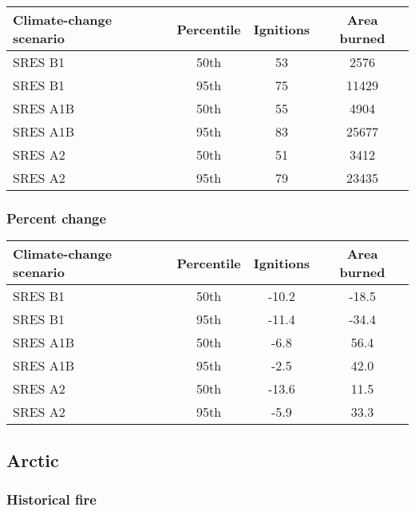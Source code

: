 \documentclass{article}\usepackage[]{graphicx}\usepackage[]{color}
\newcommand{\headcol}{\rowcolor{tableheadcolor}}
\begin{document}
\begin{table}[ht]
\centering
\begin{tabular}{lccc}
  \headcol 
 \toprule
Climate-change scenario & Percentile & Ignitions & Area burned \\ 
  \midrule
SRES B1 & 50th & 53 & 2576 \\ 
  SRES B1 & 95th & 75 & 11429 \\ 
  SRES A1B & 50th & 55 & 4904 \\ 
  SRES A1B & 95th & 83 & 25677 \\ 
  SRES A2 & 50th & 51 & 3412 \\ 
  SRES A2 & 95th & 79 & 23435 \\ 
   \bottomrule
\end{tabular}
\end{table}


\subsubsection{Percent change}

\begin{table}[ht]
\centering
\begin{tabular}{lccc}
  \headcol 
 \toprule
Climate-change scenario & Percentile & Ignitions & Area burned \\ 
  \midrule
SRES B1 & 50th & -10.2 & -18.5 \\ 
  SRES B1 & 95th & -11.4 & -34.4 \\ 
  SRES A1B & 50th & -6.8 & 56.4 \\ 
  SRES A1B & 95th & -2.5 & 42.0 \\ 
  SRES A2 & 50th & -13.6 & 11.5 \\ 
  SRES A2 & 95th & -5.9 & 33.3 \\ 
   \bottomrule
\end{tabular}
\end{table}


\newpage
\subsection{Arctic}
\subsubsection{Historical fire}
\end{document}
